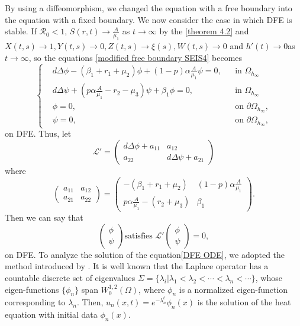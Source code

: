 \documentclass[11pt]{amsart}
\numberwithin{equation}{section}
\theoremstyle{plain}
\theoremstyle{definition}
\begin{document}
By using a diffeomorphism, we changed the equation with a free boundary into the equation with a fixed boundary. We now consider the case in which DFE is stable. If $\mathcal{R}_0<1$, $S(r,t)\rightarrow\frac{A}{\mu_1}$ as $t\to \infty$ by the \cref{theorem 4.2} and $X(t,s)\to 1, Y(t,s)\to 0, Z(t,s)\to \xi (s), W(t,s) \to 0$ and $h'(t)\to 0$as $t \to \infty$, so the equations \cref{modified free boundary SEIS4} becomes
\begin{equation} \label{DFE ODE}
	\left \{ \begin{aligned}
		&d\Delta \phi -(\beta_1+r_1+\mu_2)\phi+(1-p)\alpha \frac{A}{\mu_1}\psi=0, &&\text{in } \Omega_{h_\infty}\\
		&d\Delta\psi +(p\alpha \frac{A}{\mu_1}-r_2-\mu_3)\psi+\beta_1\phi=0,  &&\text{in } \Omega_{h_\infty}\\
		&\phi=0, &&\text{on } \partial \Omega_{h_\infty},\\
		&\psi=0, &&\text{on } \partial \Omega_{h_\infty},
	\end{aligned} \right.
\end{equation}
on DFE. Thus, let
\begin{equation} \label{operator L}
	\mathcal{L}'=\begin{pmatrix}
		d\Delta \phi +a_{11} & a_{12} \\
		a_{22} & d\Delta\psi+ a_{21}
	\end{pmatrix}
\end{equation}
where
\begin{equation*}
\begin{pmatrix}
a_{11} & a_{12} \\
a_{21} & a_{22}
\end{pmatrix}
=
\begin{pmatrix}
-(\beta_1 + r_1 + \mu_2) & (1 - p)\alpha \frac{A}{\mu_1} \\
p \alpha \frac{A}{\mu_1} - (r_2 + \mu_3) & \beta_1
\end{pmatrix}.
\end{equation*}
Then we can say that
\begin{equation*}
	\begin{pmatrix}
		\phi \\
		\psi
	\end{pmatrix}
	\text{satisfies }
	\mathcal{L}'
	\begin{pmatrix}
		\phi \\
		\psi
	\end{pmatrix}
	=0,
\end{equation*}
on DFE. To analyze the solution of the equation\cref{DFE ODE}, we adopted the method introduced by \cite{Lee_2008}. It is well known that the Laplace operator has a countable discrete set of eigenvalues $\Sigma = \{\lambda_i \vert \lambda_1< \lambda_2 < \cdots < \lambda_n < \cdots \}$, whose eigen-functions $\{\phi_n\}$ span $W_0^{1,2}(\Omega)$, where $\phi_n$ is a normalized eigen-function corresponding to $\lambda_n$. Then, $u_n(x,t)=e^{-\lambda_n^t}\phi_n(x)$ is the solution of the heat equation with initial data $\phi_n(x)$.
\end{document}
